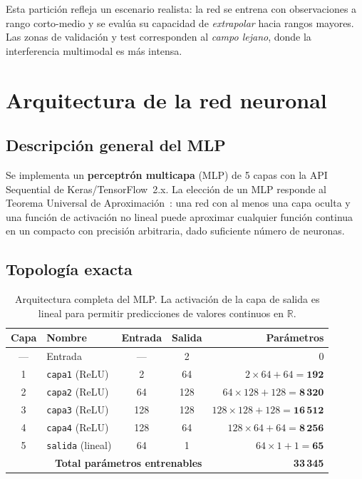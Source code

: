 \documentclass[12pt,a4paper]{article}
\begin{document}
Esta partición refleja un escenario realista: la red se entrena con observaciones
a rango corto-medio y se evalúa su capacidad de \emph{extrapolar} hacia
rangos mayores. Las zonas de validación y test corresponden al \emph{campo
lejano}, donde la interferencia multimodal es más intensa.

\section{Arquitectura de la red neuronal}

\subsection{Descripción general del MLP}

Se implementa un \textbf{perceptrón multicapa} (MLP) de 5 capas con la API
Sequential de Keras/TensorFlow~2.x. La elección de un MLP responde al Teorema
Universal de Aproximación~\cite{hornik1989}: una red con al menos una capa
oculta y una función de activación no lineal puede aproximar cualquier función
continua en un compacto con precisión arbitraria, dado suficiente número de
neuronas.

\subsection{Topología exacta}

\begin{table}[H]
\centering
\caption{Arquitectura completa del MLP. La activación de la capa de salida
         es lineal para permitir predicciones de valores continuos en
         $\mathbb{R}$.}
\label{tab:arquitectura}
\begin{tabular}{clccr}
\toprule
Capa & Nombre & Entrada & Salida & Parámetros \\
\midrule
---  & Entrada    & ---  & 2   & 0      \\
1    & \texttt{capa1} (ReLU) & 2   & 64  & $2 \times 64 + 64 = \mathbf{192}$   \\
2    & \texttt{capa2} (ReLU) & 64  & 128 & $64 \times 128 + 128 = \mathbf{8\,320}$ \\
3    & \texttt{capa3} (ReLU) & 128 & 128 & $128 \times 128 + 128 = \mathbf{16\,512}$ \\
4    & \texttt{capa4} (ReLU) & 128 & 64  & $128 \times 64 + 64 = \mathbf{8\,256}$  \\
5    & \texttt{salida} (lineal) & 64 & 1  & $64 \times 1 + 1 = \mathbf{65}$     \\
\midrule
\multicolumn{4}{r}{\textbf{Total parámetros entrenables}} & \textbf{33\,345} \\
\bottomrule
\end{tabular}
\end{table}
\end{document}
